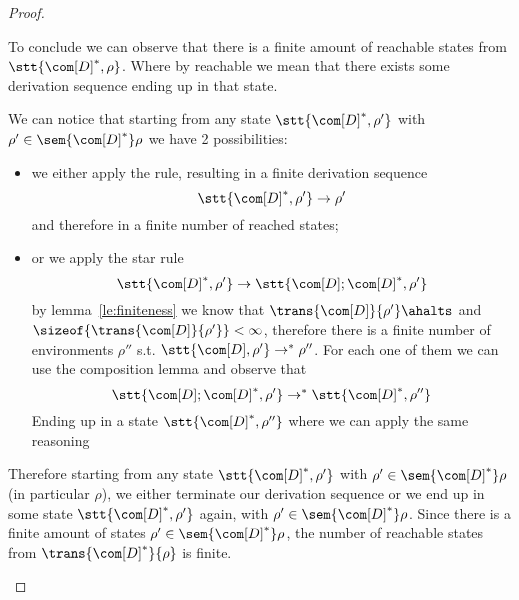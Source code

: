 \begin{proof}
\begin{itemize}
    To conclude we can observe that there is a finite amount of
    reachable states from \(\stt{\com[D]^*, \rho}\). Where by reachable
    we mean that there exists some derivation sequence ending up in
    that state.

    We can notice that starting from any state
    \(\stt{\com[D]^*, \rho'}\) with \(\rho'\in \sem{\com[D]^*}\rho\)
    we have 2 possibilities:
    \begin{itemize}
    \item we either apply the \starfix rule, resulting in a finite
      derivation sequence
      \begin{equation*}
        \stt{\com[D]^*, \rho'} \to \rho'
      \end{equation*}
      and therefore in a finite number of reached states;
    \item or we apply the star rule
      \begin{equation*}
        \stt{\com[D]^*, \rho'} \to \stt{\com[D];\com[D]^*, \rho'}
      \end{equation*}
      by lemma~\ref{le:finiteness} we know that
      \(\trans{\com[D]}{\rho'}\ahalts\) and
      \(\sizeof{\trans{\com[D]}{\rho'}} < \infty\), therefore there is
      a finite number of environments \(\rho''\)
      s.t. \(\stt{\com[D],\rho'} \to^* \rho''\). For each one of them
      we can use the composition lemma and observe that
      \begin{equation*}
        \stt{\com[D];\com[D]^*, \rho'} \to^* \stt{\com[D]^*, \rho''}
      \end{equation*}
      Ending up in a state \(\stt{\com[D]^*, \rho''}\) where we can
      apply the same reasoning
    \end{itemize}
    Therefore starting from any state \(\stt{\com[D]^*, \rho'}\) with
    \(\rho'\in \sem{\com[D]^*}\rho\) (in particular \(\rho\)), we
    either terminate our derivation sequence or we end up in some
    state \(\stt{\com[D]^*, \rho'}\) again, with
    \(\rho'\in\sem{\com[D]^*}\rho\). Since there is a finite amount of
    states \(\rho'\in\sem{\com[D]^*}\rho\), the number of reachable
    states from \(\trans{\com[D]^*}{\rho}\) is finite.
  \end{itemize}
\end{proof}
